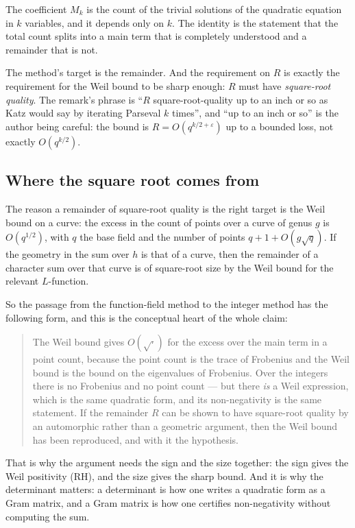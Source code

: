 The coefficient $M_k$ is the count of the trivial solutions of the quadratic
equation in $k$ variables, and it depends only on $k$. The identity is the
statement that the total count splits into a main term that is completely
understood and a remainder that is not.

The method's target is the remainder. And the requirement on $R$ is exactly the
requirement for the Weil bound to be sharp enough: $R$ must have
\emph{square-root quality}. The remark's phrase is ``$R$ square-root-quality up
to an inch or so as Katz would say by iterating Parseval $k$ times'', and
``up to an inch or so'' is the author being careful: the bound is
$R = O(q^{k/2 + \varepsilon})$ up to a bounded loss, not exactly
$O(q^{k/2})$.

\subsection{Where the square root comes from}The reason a remainder of square-root quality is the right target is the
Weil bound on a curve: the excess in the count of points over a curve of genus
$g$ is $O(q^{1/2})$, with $q$ the base field and the number of points
$q + 1 + O(g\sqrt q)$. If the geometry in the sum over $h$ is that of a curve,
then the remainder of a character sum over that curve is of square-root size
by the Weil bound for the relevant $L$-function.

So the passage from the function-field method to the integer method has the
following form, and this is the conceptual heart of the whole claim:

\begin{quote}
The Weil bound gives $O(\sqrt{\cdot})$ for the excess over the main term in a
point count, because the point count is the trace of Frobenius and the Weil
bound is the bound on the eigenvalues of Frobenius. Over the integers there is
no Frobenius and no point count --- but there \emph{is} a Weil expression,
which is the same quadratic form, and its non-negativity is the same
statement. If the remainder $R$ can be shown to have square-root quality by an
automorphic rather than a geometric argument, then the Weil bound has been
reproduced, and with it the hypothesis.
\end{quote}

That is why the argument needs the sign and the size together: the sign gives
the Weil positivity (RH), and the size gives the sharp bound. And it is why
the determinant matters: a determinant is how one writes a quadratic form as a
Gram matrix, and a Gram matrix is how one certifies non-negativity without
computing the sum.


